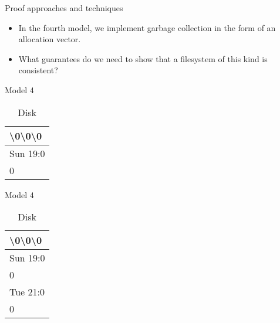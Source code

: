 \documentclass{beamer}
\begin{document}
\begin{frame}{Proof approaches and techniques}
  \begin{itemize}
  \item In the fourth model, we implement garbage collection in the
    form of an allocation vector.
  \item What guarantees do we need to show that a filesystem of this
    kind is consistent?
  \end{itemize}
\end{frame}

\begin{frame}{Model 4}
  \begin{figure}
    \def\svgwidth{0.7\columnwidth}
    
  \end{figure}
  \begin{table}[]
    \caption{Disk}
    \label{my-label}
    \begin{tabular}{|l|}
      \hline
      \textbackslash0\textbackslash0\textbackslash0   \\ \hline
      Sun 19:0 \\ \hline
      0        \\ \hline
    \end{tabular}
  \end{table}
\end{frame}

\begin{frame}{Model 4}
  \begin{figure}
    \def\svgwidth{0.7\columnwidth}
    
  \end{figure}
  \begin{table}[]
    \centering
    \caption{Disk}
    \label{my-label}
    \begin{tabular}{|l|}
      \hline
      \textbackslash0\textbackslash0\textbackslash0   \\ \hline
      Sun 19:0 \\ \hline
      0        \\ \hline
      Tue 21:0 \\ \hline
      0        \\ \hline
    \end{tabular}
  \end{table}
\end{frame}
\end{document}
